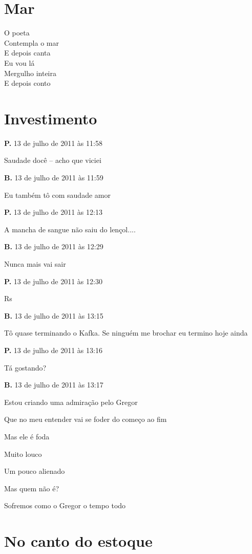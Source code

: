 \chapter{Mar}

{\parindent0pt
O poeta\\
Contempla o mar\\
E depois canta\\
Eu vou lá\\
Mergulho inteira\\
E depois conto\\
}

\chapter{Investimento}


{\parindent0pt\parskip1pt\raggedright
\textbf{P.} 13 de julho de 2011 às 11:58

Saudade docê -- acho que viciei

\textbf{B.} 13 de julho de 2011 às 11:59

Eu também tô com saudade amor

\textbf{P.} 13 de julho de 2011 às 12:13

A mancha de sangue não saiu do lençol....

\textbf{B.} 13 de julho de 2011 às 12:29

Nunca mais vai sair

\textbf{P.} 13 de julho de 2011 às 12:30

Rs

\textbf{B.} 13 de julho de 2011 às 13:15

Tô quase terminando o Kafka. Se ninguém me brochar eu termino hoje ainda

\textbf{P.} 13 de julho de 2011 às 13:16

Tá gostando?

\textbf{B.} 13 de julho de 2011 às 13:17

Estou criando uma admiração pelo Gregor

Que no meu entender vai se foder do começo ao fim

Mas ele é foda

Muito louco

Um pouco alienado

Mas quem não é?

Sofremos como o Gregor o tempo todo

\chapter{No canto do estoque}

}
